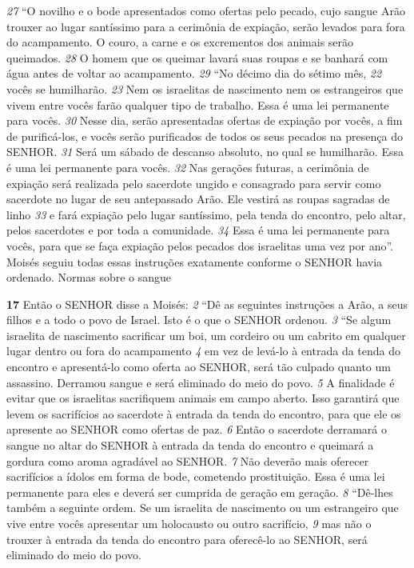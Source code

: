 \textit{\tiny 27}
“O novilho e o bode apresentados como ofertas pelo pecado, cujo sangue
Arão trouxer ao lugar santíssimo para a cerimônia de expiação, serão levados para
fora do acampamento. O couro, a carne e os excrementos dos animais serão
queimados. 
\textit{\tiny 28}
O homem que os queimar lavará suas roupas e se banhará com
água antes de voltar ao acampamento.
\textit{\tiny 29}
“No décimo dia do sétimo mês,
\textit{\tiny 22}
 vocês se humilharão.
\textit{\tiny 23}
 Nem os israelitas de
nascimento nem os estrangeiros que vivem entre vocês farão qualquer tipo de
trabalho. Essa é uma lei permanente para vocês. 
\textit{\tiny 30}
Nesse dia, serão apresentadas
ofertas de expiação por vocês, a fim de purificá-los, e vocês serão purificados de
todos os seus pecados na presença do SENHOR. 
\textit{\tiny 31}
Será um sábado de descanso
absoluto, no qual se humilharão. Essa é uma lei permanente para vocês. 
\textit{\tiny 32}
Nas
gerações futuras, a cerimônia de expiação será realizada pelo sacerdote ungido e
consagrado para servir como sacerdote no lugar de seu antepassado Arão. Ele
vestirá as roupas sagradas de linho 
\textit{\tiny 33}
e fará expiação pelo lugar santíssimo, pela
tenda do encontro, pelo altar, pelos sacerdotes e por toda a comunidade. 
\textit{\tiny 34}
Essa é
uma lei permanente para vocês, para que se faça expiação pelos pecados dos
israelitas uma vez por ano”.
   Moisés seguiu todas essas instruções exatamente conforme o SENHOR havia
ordenado.
Normas sobre o sangue

\bigskip   
\textbf{\large 17}
 Então o SENHOR disse a Moisés: 
\textit{\tiny 2} 
“Dê as seguintes instruções a Arão, a seus
filhos e a todo o povo de Israel. Isto é o que o SENHOR ordenou. 
\textit{\tiny 3} 
“Se algum israelita de nascimento sacrificar um boi,
 um cordeiro ou um
cabrito em qualquer lugar dentro ou fora do acampamento 
\textit{\tiny 4} 
em vez de levá-lo à
entrada da tenda do encontro e apresentá-lo como oferta ao SENHOR, será tão
culpado quanto um assassino.
 Derramou sangue e será eliminado do meio do
povo. 
\textit{\tiny 5} 
A finalidade é evitar que os israelitas sacrifiquem animais em campo
aberto. Isso garantirá que levem os sacrifícios ao sacerdote à entrada da tenda do
encontro, para que ele os apresente ao SENHOR como ofertas de paz. 
\textit{\tiny 6} 
Então o
sacerdote derramará o sangue no altar do SENHOR à entrada da tenda do encontro
e queimará a gordura como aroma agradável ao SENHOR. 
\textit{\tiny 7} 
Não deverão mais
oferecer sacrifícios a ídolos em forma de bode,
 cometendo prostituição. Essa é
uma lei permanente para eles e deverá ser cumprida de geração em geração. 
\textit{\tiny 8} 
“Dê-lhes também a seguinte ordem. Se um israelita de nascimento ou um
estrangeiro que vive entre vocês apresentar um holocausto ou outro sacrifício, 
\textit{\tiny 9} 
mas não o trouxer à entrada da tenda do encontro para oferecê-lo ao SENHOR,
será eliminado do meio do povo.
   
